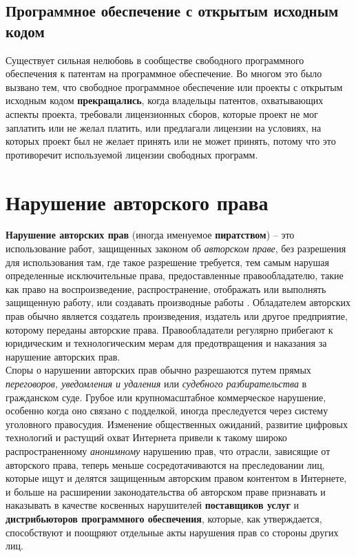 \documentclass[12pt, oneside, a4paper]{article}
\begin{document}
\begin{sloppypar}
\subsection{Программное обеспечение с открытым исходным кодом}
Существует сильная нелюбовь в сообществе свободного программного обеспечения к патентам на программное обеспечение. Во многом это было вызвано тем, что свободное программное обеспечение или проекты с открытым исходным кодом \textbf{прекращались}, когда владельцы патентов, охватывающих аспекты проекта, требовали лицензионных сборов, которые проект не мог заплатить или не желал платить, или предлагали лицензии на условиях, на которых проект был не желает принять или не может принять, потому что это противоречит используемой лицензии свободных программ.

\newpage


\section{Нарушение авторского права}
\textbf{Нарушение авторских прав} (иногда именуемое \textbf{пиратством}) -- это использование работ, защищенных законом об \textit{авторском праве}, без разрешения для использования там, где такое разрешение требуется, тем самым нарушая определенные исключительные права, предоставленные правообладателю, такие как право на воспроизведение, распространение, отображать или выполнять защищенную работу, или создавать производные работы . Обладателем авторских прав обычно является создатель произведения, издатель или другое предприятие, которому переданы авторские права. Правообладатели регулярно прибегают к юридическим и технологическим мерам для предотвращения и наказания за нарушение авторских прав.\\

Споры о нарушении авторских прав обычно разрешаются путем прямых \textit{переговоров, уведомления и удаления} или \textit{судебного разбирательства} в гражданском суде. Грубое или крупномасштабное коммерческое нарушение, особенно когда оно связано с подделкой, иногда преследуется через систему уголовного правосудия. Изменение общественных ожиданий, развитие цифровых технологий и растущий охват Интернета привели к такому широко распространенному \textit{анонимному} нарушению прав, что отрасли, зависящие от авторского права, теперь меньше сосредотачиваются на преследовании лиц, которые ищут и делятся защищенным авторским правом контентом в Интернете, и больше на расширении законодательства об авторском праве признавать и наказывать в качестве косвенных нарушителей \textbf{поставщиков услуг} и \textbf{дистрибьюторов программного обеспечения}, которые, как утверждается, способствуют и поощряют отдельные акты нарушения прав со стороны других лиц. 


\end{sloppypar}
\end{document}
